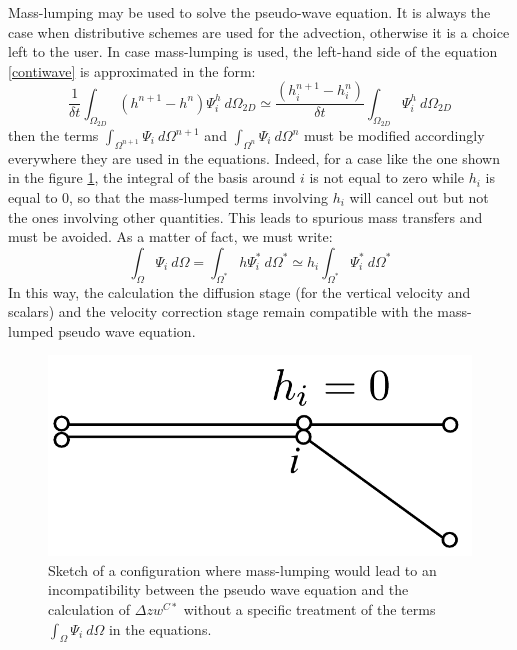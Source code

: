 Mass-lumping may be used to solve the pseudo-wave equation.
It is always the case when distributive schemes are used for the advection,
otherwise it is a choice left to the user.
In case mass-lumping is used, the left-hand side of the equation
\eqref{contiwave} is approximated in the form:
\begin{equation}
\dfrac{1}{\delta t}\int\nolimits_{\Omega_{2D}}(h^{n+1}-h^{n})\Psi_{i}^{h}
~d\Omega_{2D}\simeq\dfrac{(h_{i}^{n+1}-h_{i}^{n})}{\delta t}\int%
\nolimits_{\Omega_{2D}}\Psi_{i}^{h}~d\Omega_{2D}%
\end{equation}
then the terms $\int\nolimits_{\Omega^{n+1}}\Psi_{i}~d\Omega^{n+1}$ and
$\int\nolimits_{\Omega^{n}}\Psi_{i}~d\Omega^{n}$ must be modified accordingly
everywhere they are used in the equations. Indeed, for a case like the one
shown in the figure \ref{fig:masslumping}, the integral of the basis
around $i$ is not equal to zero while $h_i$ is equal to 0, so that the
mass-lumped terms involving $h_i$ will cancel out but not the ones
involving other quantities. This leads to spurious mass transfers and must be avoided. As a matter of fact, we must write:%
\begin{equation}
\int\nolimits_{\Omega}\Psi_{i}~d\Omega=\int_{\Omega^{\ast}}h\Psi_{i}^{\ast
}~d\Omega^{\ast}\simeq h_{i}\int_{\Omega^{\ast}}\Psi_{i}^{\ast}~d\Omega^{\ast}%
\label{eq:volu}
\end{equation}
In this way, the calculation the diffusion stage (for the vertical velocity and
scalars) and the velocity correction stage remain compatible
with the mass-lumped pseudo wave equation.

\begin{figure}
\begin{center}
\includegraphics[scale=0.5]{graphics/masslumping.pdf}
\end{center}
\caption{Sketch of a configuration where mass-lumping would lead to an
incompatibility between the pseudo wave equation and the calculation
of $\Delta zw^{C*}$ without a specific treatment of the terms $\int\nolimits_{\Omega}\Psi_{i}~d\Omega$ in the equations.}\label{fig:masslumping}
\end{figure}

